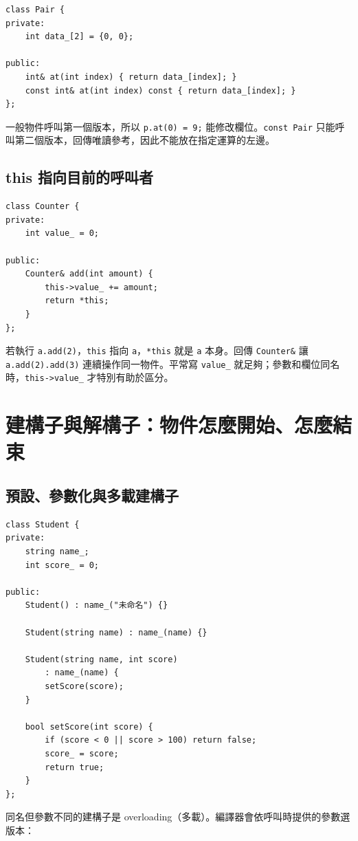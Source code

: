 \documentclass[11pt,a4paper]{article}
\newcommand{\code}[1]{\texttt{#1}}
\begin{document}
\begin{lstlisting}
class Pair {
private:
    int data_[2] = {0, 0};

public:
    int& at(int index) { return data_[index]; }
    const int& at(int index) const { return data_[index]; }
};
\end{lstlisting}

一般物件呼叫第一個版本，所以 \code{p.at(0) = 9;} 能修改欄位。\code{const Pair} 只能呼叫第二個版本，回傳唯讀參考，因此不能放在指定運算的左邊。

\subsection{this 指向目前的呼叫者}

\begin{lstlisting}
class Counter {
private:
    int value_ = 0;

public:
    Counter& add(int amount) {
        this->value_ += amount;
        return *this;
    }
};
\end{lstlisting}

若執行 \code{a.add(2)}，\code{this} 指向 \code{a}，\code{*this} 就是 \code{a} 本身。回傳 \code{Counter\&} 讓 \code{a.add(2).add(3)} 連續操作同一物件。平常寫 \code{value\_} 就足夠；參數和欄位同名時，\code{this->value\_} 才特別有助於區分。

\section{建構子與解構子：物件怎麼開始、怎麼結束}

\subsection{預設、參數化與多載建構子}

\begin{lstlisting}
class Student {
private:
    string name_;
    int score_ = 0;

public:
    Student() : name_("未命名") {}

    Student(string name) : name_(name) {}

    Student(string name, int score)
        : name_(name) {
        setScore(score);
    }

    bool setScore(int score) {
        if (score < 0 || score > 100) return false;
        score_ = score;
        return true;
    }
};
\end{lstlisting}

同名但參數不同的建構子是 overloading（多載）。編譯器會依呼叫時提供的參數選版本：
\end{document}
